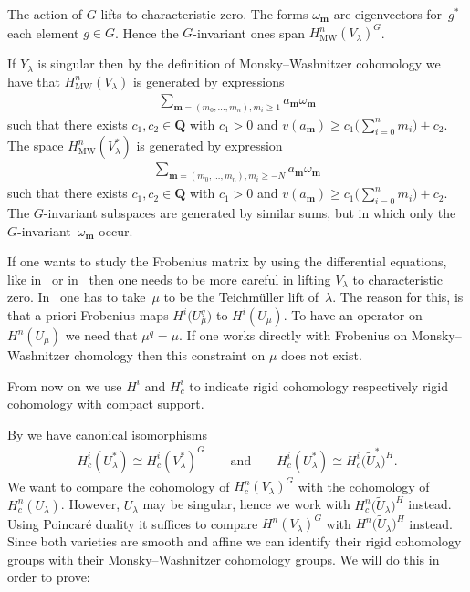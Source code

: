 \documentclass[11pt]{article}
\numberwithin{equation}{section}
\DeclareMathOperator{\MW}{MW}
\begin{document}
\begin{Remark} The action of $G$ lifts to characteristic zero. The forms $\omega_{\mathbf{m}}$ are eigenvectors for~$g^*$ each element $g\in G$. Hence the $G$-invariant ones span $H^n_{\MW}(V_\lambda)^G$.

If $Y_{\lambda}$ is singular then by the def\/inition of Monsky--Washnitzer cohomology we have that $H^n_{\MW}(V_\lambda)$ is generated by expressions
\begin{gather*} \sum_{\mathbf{m}=(m_0,\dots,m_n),m_i\geq 1} a_{\mathbf{m}} \omega_{\mathbf{m}}\end{gather*}
such that there exists $c_1,c_2 \in \mathbf{Q}$ with $c_1>0$ and $v(a_{\mathbf{m}})\geq c_1\big(\sum\limits_{i=0}^n m_i\big)+c_2$. The space $H^n_{\MW}(V_\lambda^*)$ is generated by expression
\begin{gather*} \sum_{\mathbf{m}=(m_0,\dots,m_n),m_i\geq -N} a_{\mathbf{m}} \omega_{\mathbf{m}}\end{gather*}
such that there exists $c_1,c_2 \in \mathbf{Q}$ with $c_1>0$ and $v(a_{\mathbf{m}})\geq c_1\big(\sum\limits_{i=0}^n m_i\big)+c_2$. The $G$-invariant subspaces are generated by similar sums, but in which only the $G$-invariant~$\omega_{\mathbf{m}}$ occur.
\end{Remark}

\begin{Remark} If one wants to study the Frobenius matrix by using the dif\/ferential equations, like in~\cite{Katz} or in~\cite{DKSSVW} then one needs to be more careful in lifting $V_\lambda$ to characteristic zero. In~\cite{Katz} one has to take~$\mu$ to be the Teichm\"uller lift of~$\lambda$. The reason for this, is that a priori Frobenius maps $H^i\big(U_\mu^q\big)$ to $H^i(U_\mu)$. To have an operator on $H^n(U_\mu)$ we need that $\mu^q=\mu$. If one works directly with Frobenius on Monsky--Washnitzer chomology then this constraint on $\mu$ does not exist.
\end{Remark}

From now on we use $H^i$ and $H^i_c$ to indicate rigid cohomology respectively rigid cohomology with compact support.

By \cite[Proposition 2.1]{Zetafamrec} we have canonical isomorphisms
\begin{gather*} H^i_c(U_\lambda^*)\cong H^i_c(V_\lambda^*)^G \qquad \text{and} \qquad H^i_c(U_\lambda^*)\cong H^i_c\big(\tilde{U}_\lambda^*\big)^H.\end{gather*}
We want to compare the cohomology of $H^n_c(V_\lambda)^G$ with the cohomology of~$H^n_c(U_{\lambda})$. However, $U_\lambda$ may be singular, hence we work with $H^n_c\big(\tilde{U}_\lambda\big)^ H$ instead. Using Poin\-car\'e duality it suf\/f\/ices to compare $H^n(V_\lambda)^ G$ with $H^n\big(\tilde{U}_\lambda\big)^H$ instead. Since both varieties are smooth and af\/f\/ine we can identify their rigid cohomology groups with their Monsky--Washnitzer cohomology groups. We will do this in order to prove:
\end{document}
